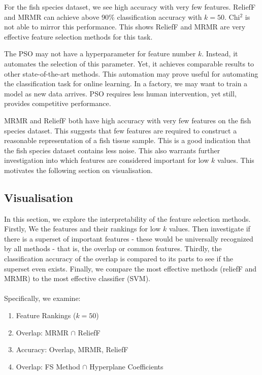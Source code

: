 \documentclass{article}
\begin{document}
For the fish species dataset, we see high accuracy with very few features.
ReliefF and MRMR can achieve above 90\% classification accuracy with $k = 50$.
Chi$^2$ is not able to mirror this performance.
This shows ReliefF and MRMR are very effective feature selection methods for this task.

The PSO may not have a hyperparameter for feature number $k$.
Instead, it automates the selection of this parameter.
Yet, it achieves comparable results to other state-of-the-art methods.
This automation may prove useful for automating the classification task for online learning.
In a factory, we may want to train a model as new data arrives.
PSO requires less human intervention, yet still, provides competitive performance.

MRMR and ReliefF both have high accuracy with very few features on the fish species dataset.
This suggests that few features are required to construct a reasonable representation of a fish tissue sample.
This is a good indication that the fish species dataset contains less noise.
This also warrants further investigation into which features are considered important for low $k$ values.
This motivates the following section on visualisation.

\subsection{Visualisation}
\label{sec:results-visualisation}

In this section, we explore the interpretability of the feature selection methods.
Firstly, We the features and their rankings for low $k$ values.
Then investigate if there is a superset of important features - these would be universally recognized by all methods - that is, the overlap or common features.
Thirdly, the classification accuracy of the overlap is compared to its parts to see if the superset even exists.
Finally, we compare the most effective methods (reliefF and MRMR) to the most effective classifier (SVM).
\\\\
Specifically, we examine:

\begin{enumerate}
  \item Feature Rankings ($k = 50$)
  \item Overlap: MRMR $\cap$ ReliefF
  \item Accuracy: Overlap, MRMR, ReliefF
  \item Overlap: FS Method $\cap$ Hyperplane Coefficients
\end{enumerate}
\end{document}
